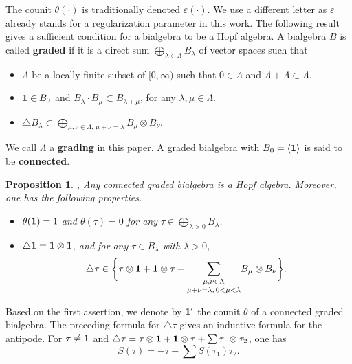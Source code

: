 \documentclass[10pt, reqno]{amsart}
\numberwithin{subsection}{section}
\numberwithin{subsubsection}{subsection}
\numberwithin{equation}{section} %
\theoremstyle{mystyle}
\newtheorem{prop}[thm]{\hspace{-0.13cm} {Proposition}}%
\theoremstyle{mystyle2}
\theoremstyle{mystyle3}
\renewcommand{\epsilon}{\varepsilon}
\begin{document}
\medskip

The counit $\theta(\cdot)$ is traditionally denoted $\varepsilon(\cdot)$. 
We use a different letter as $\epsilon$ already stands for a regularization parameter in this work. The following result gives a sufficient condition for a bialgebra to be a Hopf algebra.
A bialgebra $B$ is called \textbf{\textsf{graded}} if it is a direct sum $\bigoplus_{\lambda\in \Lambda} B_\lambda$ of vector spaces such that
\begin{itemize}
\setlength{\itemsep}{1pt}
\item $\Lambda$ be a locally finite subset of $[0,\infty)$ such that $0\in \Lambda$ and $\Lambda+\Lambda\subset \Lambda$.
\item ${\bf1}\in B_0$ and $B_\lambda \cdot B_\mu\subset B_{\lambda+\mu}$, 
for any $\lambda,\mu\in\Lambda$.
\item $\triangle B_\lambda\subset\bigoplus_{\mu,\nu\in \Lambda,\, \mu+\nu=\lambda} B_\mu\otimes B_\nu$.
\end{itemize}
We call $\Lambda$ a \textbf{\textsf{grading}} in this paper. A graded bialgebra with $B_0 = \langle{\bf1}\rangle$ is said to be \textbf{\textsf{connected}}.

\medskip

\begin{prop}
\cite[Exercises pages 228 and 238]{Sweedler},
\cite[Proposition II.1.1 and Corollary II.3.2]{Manchon}   
\label{PropBialgebraHopf}
Any connected graded bialgebra is a Hopf algebra. Moreover, one has the following properties.
\begin{itemize}
\setlength{\itemsep}{1pt}
\item $\theta({\bf1})=1$ and $\theta(\tau)=0$ for any $\tau\in\bigoplus_{\lambda>0}B_\lambda$.
\item $\triangle{\bf1}={\bf1}\otimes{\bf1}$, and for any $\tau\in B_\lambda$ with $\lambda>0$,
$$
\triangle\tau\in \bigg\{\tau\otimes{\bf1}+{\bf1}\otimes\tau + \underset{\mu+\nu=\lambda,\,0<\mu<\lambda}{\sum_{\mu,\nu\in \Lambda} }B_\mu\otimes 
B_\nu \bigg\}.
$$
\end{itemize}
\end{prop}

\noindent Based on the first assertion, we denote by ${\bf1}'$ the counit 
$\theta$ of a connected graded bialgebra. The preceding formula for $\triangle\tau$ gives an inductive formula for the antipode. For $\tau\neq {\bf 1}$ and $\triangle\tau = \tau\otimes{\bf 1} + {\bf 1}\otimes \tau + \sum \tau_1\otimes\tau_2$, one has
$$
S(\tau) = -\tau - \sum S(\tau_1)\tau_2.
$$ 
\end{document}
